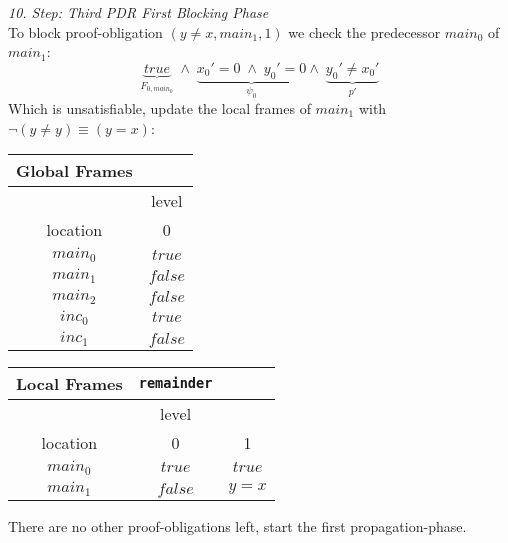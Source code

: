 \documentclass{article}
\begin{document}
	\textsl{10. Step: Third PDR First Blocking Phase} \\
		To block proof-obligation $(y \neq x, main_1, 1)$ we check the predecessor $main_0$ of $main_1$: \\
	\begin{equation*}
	\underbrace{true}_{F_{0, main_0}}\; \land \; \underbrace{x_0' = 0 \; \land \; y_0' = 0}_{\psi_0} \land \; \underbrace{y_0' \neq x_0'}_{p'}
	\end{equation*}
	Which is unsatisfiable, update the local frames of $main_1$ with $\neg(y \neq y) \equiv (y = x)$: \\ 
	\begin{minipage}{.5\textwidth}
		\setlength\tabcolsep{0.35em}
		\begin{center}
			\begin{tabu}{cc}
				Global Frames \\
				\toprule
				& level \\
				\cmidrule(lr){2-2}
				location & 0 \\
				$main_0$ & $true$ \\
				$main_1$ & $false$ \\
				$main_2$ & $false$ \\
				$inc_0$ & $true$ \\
				$inc_1$ & $false$\\
				\bottomrule
			\end{tabu}
		\end{center}
	\end{minipage}
	\hfill
	\begin{minipage}{.4\textwidth}
		\setlength\tabcolsep{0.35em}
		\begin{center}
			\begin{tabu}{ccc}
				Local Frames & \texttt{remainder}\\
				\toprule
				& level \\
				\cmidrule(lr){2-2}
				location & 0 & 1 \\
				\cmidrule{1-3}
				$main_0$ & $true$ & $true$ \\
				$main_1$ & $false$ & $y = x$\\
				\bottomrule
			\end{tabu}
		\end{center}	
	\end{minipage}
	
	\vspace*{1em}
	
	There are no other proof-obligations left, start the first propagation-phase. \\ \\
	
\end{document}
